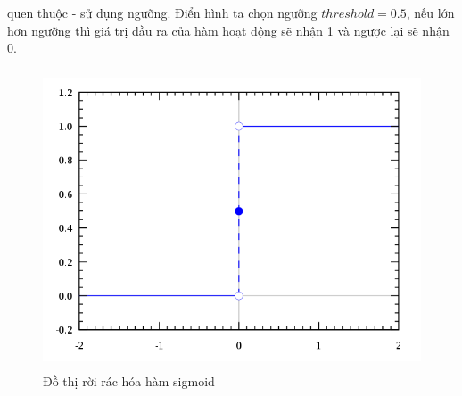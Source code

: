 quen thuộc - sử dụng ngưỡng. Điển hình ta chọn ngưỡng $threshold = 0.5$, nếu 
lớn hơn ngưỡng thì giá trị đầu ra của hàm hoạt động sẽ nhận 1 và ngược lại sẽ 
nhận 0.
\begin{figure}[h!]
\centering
\includegraphics[height=3.5in, keepaspectratio=true]{step.png}
\caption{Đồ thị rời rác hóa hàm sigmoid}
\end{figure}
